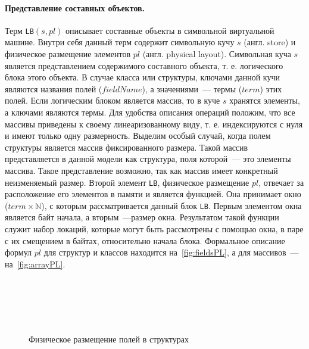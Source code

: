 \paragraph{Представление составных объектов.}
Терм \texttt{LB}$(s,pl)$ описывает составные объекты в символьной виртуальной машине. Внутри себя данный терм содержит символьную кучу $s$ (англ. store) и физическое размещение элементов $pl$ (англ. physical layout). Символьная куча $s$ является представлением содержимого составного объекта, т. е. логического блока этого объекта. В случае класса или структуры, ключами данной кучи являются названия полей ($fieldName$), а значениями~--- термы ($term$) этих полей. Если логическим блоком является массив, то в куче $s$ хранятся элементы, а ключами являются термы. Для удобства описания операций положим, что все массивы приведены к своему линеаризованному виду, т. е. индексируются с нуля и имеют только одну размерность. Выделим особый случай, когда полем структуры является массив фиксированного размера. Такой массив представляется в данной модели как структура, поля которой~--- это элементы массива. Такое представление возможно, так как массив имеет конкретный неизменяемый размер. Второй элемент \texttt{LB}, физическое размещение $pl$, отвечает за расположение его элементов в памяти и является функцией. Она принимает окно ($term \times \mathbb{N}$), с которым рассматривается данный блок \texttt{LB}. Первым элементом окна является байт начала, а вторым~---размер окна. Результатом такой функции служит набор локаций, которые могут быть рассмотрены с помощью окна, в паре с их смещением в байтах, относительно начала блока. Формальное описание формул $pl$ для структур и классов находится на~\autoref{fig:fieldsPL}, а для массивов~--- на~\autoref{fig:arrayPL}.

\begin{figure}
\centering
\tiny
\setlength{\jot}{1pt}
\begin{mymathbox}
     \\
     \\
     \\
     \\
\end{mymathbox}
\normalsize
\caption{Физическое размещение полей в структурах}
\label{fig:fieldsPL}
\end{figure}

